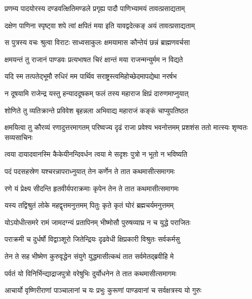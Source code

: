 \twolineshloka
{प्रणम्य पादयोरस्य दण्डवत्क्षितिमण्डले}
{प्रगृह्य पादौ पाणिभ्यामयं तावत्प्रसाद्यताम्}


\twolineshloka
{दक्षेण पाणिना स्पृष्ट्वा शपे त्वां क्षपितं मया}
{इति यावद्वदेत्कङ् अयं तावत्प्रसाद्यताम्}


\twolineshloka
{स पुत्रस्य वचः श्रुत्वा विराटः साध्वसाकुलः}
{क्षमयामास कौन्तेयं छन्नं ब्राह्मणवर्चसा}


\twolineshloka
{क्षमयन्तं तु राजानं पाण्डवः प्रत्यभाषत}
{चिरं क्षान्तं मया राजन्मन्युर्मम न विद्यते}


\twolineshloka
{यदि स्म तत्पतेद्भूमौ रुधिरं मम पार्थिव}
{सराष्ट्रस्त्वमिहोच्छेदमापद्येथा नरर्षभ}


\twolineshloka
{न दूषयामि राजेन्द्र यस्तु हन्याददूषकम्}
{फलं तस्य महाराज क्षिप्रं दारुणमाप्नुयात्}



\twolineshloka
{शोणिते तु व्यतिक्रान्ते प्रविवेश बृहन्नला}
{अभिवाद्य महाराजं कङ्कं चाप्युपतिष्ठत}


\threelineshloka
{क्षमयित्वा तु कौरव्यं रणादुत्तरमागतम्}
{परिष्वज्य दृढं राजा प्रवेश्य भवनोत्तमम्}
{प्रशशंस ततो मात्स्यः शृण्वतः सव्यसाचिनः}




\twolineshloka
{त्वया दायादवानस्मि कैकेयीनन्दिवर्धन}
{त्वया मे सदृशः पुत्रो न भूतो न भविष्यति}


\twolineshloka
{पदं पदसहस्रेण यश्चरन्नापराध्नुयात्}
{तेन कर्णेन ते तात कथमासीत्समागमः}


\twolineshloka
{रणे यं प्रेक्ष्य सीदन्ति हृतवीर्यपराक्रमाः}
{कृपेन तेन ते तात कथमासीत्समागमः}


\twolineshloka
{यस्य तद्विश्रुतं लोके महद्वृत्तमनुत्तमम्}
{पितुः कृते कृतं घोरं ब्रह्मचर्यमनुत्तमम्}


\twolineshloka
{योऽयोधीत्समरे रामं जामदग्न्यं प्रतापिनम्}
{भीष्मोसौ पुरुषव्याघ्र न च युद्धे पराजितः}


\twolineshloka
{पराक्रमी च दुर्धर्षो विद्वाञ्शूरो जितेन्द्रियः}
{दृढवेधी क्षिप्रकारी विश्रुतः सर्वकर्मसु}


\twolineshloka
{तेन ते सह भीष्मेण कुरुवृद्धेन संयुगे}
{युद्धमासीत्कथं तात सर्वमेतद्ब्रवीहि मे}


\twolineshloka
{पर्वतं यो विनिर्भिन्द्याद्राजपुत्रो वरेषुभिः}
{दुर्योधनेन ते तात कथमासीत्समागमः}


\twolineshloka
{आचार्यो वृष्णिरीराणां पाञ्चालानां च यः प्रभुः}
{कुरूणां पाण्डवानां च सर्वक्षत्रस्य यो गुरुः}



